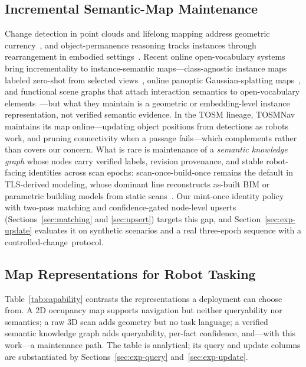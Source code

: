 \documentclass[electronics,article,accept,pdftex,moreauthors]{Definitions/mdpi}
\begin{document}
\subsection{Incremental Semantic-Map Maintenance}
Change detection in point clouds and lifelong mapping address geometric
currency~\cite{fehr2017tsdf}, and object-permanence reasoning tracks
instances through rearrangement in embodied settings~\cite{wald2019rescan}.
Recent online open-vocabulary systems bring incrementality to
instance-semantic maps---class-agnostic instance maps labeled zero-shot
from selected views~\cite{deng2026ovimap}, online panoptic
Gaussian-splatting maps~\cite{zhai2026onlinepg}, and functional scene
graphs that attach interaction semantics to open-vocabulary
elements~\cite{zhang2025funcgraph}---but what they maintain is a
geometric or embedding-level instance representation, not verified
semantic evidence.
In the TOSM lineage, TOSMNav~\cite{joo2022fsom} maintains its map
online---updating object positions from detections as robots work, and
pruning connectivity when a passage fails---which complements rather than
covers our concern.
What is rare is maintenance of a \emph{semantic knowledge graph} whose
nodes carry verified labels, revision provenance, and stable robot-facing
identities across scan epochs:
scan-once-build-once remains the default in TLS-derived modeling, whose
dominant line reconstructs as-built BIM or parametric building models from
static scans~\cite{tang2010asbuilt,ochmann2016parametric}. Our
mint-once identity policy with two-pass matching and confidence-gated
node-level upserts (Sections~\ref{sec:matching} and \ref{sec:upsert}) targets this
gap, and Section~\ref{sec:exp-update} evaluates it on synthetic scenarios and a
real three-epoch sequence with a controlled-\mbox{change protocol}.

\subsection{Map Representations for Robot Tasking}
Table~\ref{tab:capability} contrasts the representations a deployment can
choose from. A 2D occupancy map supports navigation but neither queryability
nor semantics; a raw 3D scan adds geometry but no task language; a verified
semantic knowledge graph adds queryability, per-fact confidence, and---with
this work---a maintenance path. The table is analytical; its query and
update columns are substantiated by Sections~\ref{sec:exp-query}
and~\ref{sec:exp-update}.
\end{document}
